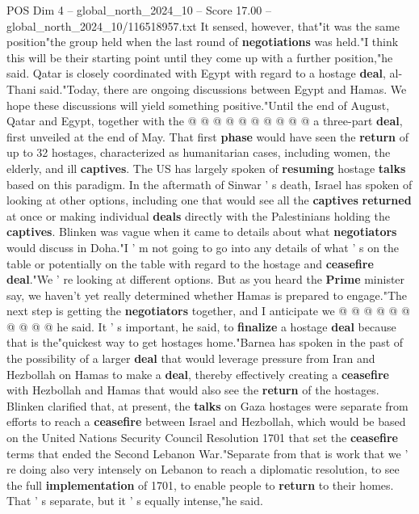 \begin{textsample}{POS Dim 4 – global\_north\_2024\_10 – Score 17.00 – global\_north\_2024\_10/116518957.txt}
It sensed, however, that"it was the same position"the group held when the last round of \textbf{negotiations} was held."I think this will be their starting point until they come up with a further position,"he said.
Qatar is closely coordinated with Egypt with regard to a hostage \textbf{deal}, al-Thani said."Today, there are ongoing discussions between Egypt and Hamas.
We hope these discussions will yield something positive."Until the end of August, Qatar and Egypt, together with the @ @ @ @ @ @ @ @ @ @ a three-part \textbf{deal}, first unveiled at the end of May.
That first \textbf{phase} would have seen the \textbf{return} of up to 32 hostages, characterized as humanitarian cases, including women, the elderly, and ill \textbf{captives}.
The US has largely spoken of \textbf{resuming} hostage \textbf{talks} based on this paradigm.
In the aftermath of Sinwar ' s death, Israel has spoken of looking at other options, including one that would see all the \textbf{captives} \textbf{returned} at once or making individual \textbf{deals} directly with the Palestinians holding the \textbf{captives}.
Blinken was vague when it came to details about what \textbf{negotiators} would discuss in Doha."I ' m not going to go into any details of what ' s on the table or potentially on the table with regard to the hostage and \textbf{ceasefire} \textbf{deal}."We ' re looking at different options.
But as you heard the \textbf{Prime} minister say, we haven't yet really determined whether Hamas is prepared to engage."The next step is getting the \textbf{negotiators} together, and I anticipate we @ @ @ @ @ @ @ @ @ @ he said.
It ' s important, he said, to \textbf{finalize} a hostage \textbf{deal} because that is the"quickest way to get hostages home."Barnea has spoken in the past of the possibility of a larger \textbf{deal} that would leverage pressure from Iran and Hezbollah on Hamas to make a \textbf{deal}, thereby effectively creating a \textbf{ceasefire} with Hezbollah and Hamas that would also see the \textbf{return} of the hostages.
Blinken clarified that, at present, the \textbf{talks} on Gaza hostages were separate from efforts to reach a \textbf{ceasefire} between Israel and Hezbollah, which would be based on the United Nations Security Council Resolution 1701 that set the \textbf{ceasefire} terms that ended the Second Lebanon War."Separate from that is work that we ' re doing also very intensely on Lebanon to reach a diplomatic resolution, to see the full \textbf{implementation} of 1701, to enable people to \textbf{return} to their homes.
That ' s separate, but it ' s equally intense,"he said.

\end{textsample}

